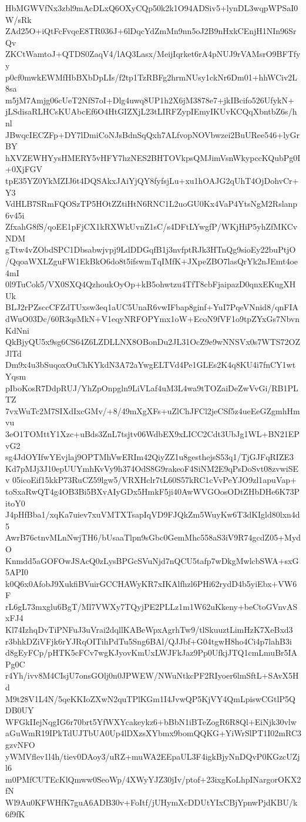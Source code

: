 HbMGWVfNx3zbl9mAcDLxQ6OXyCQp50k2k1O94ADSiv5+lynDL3wqpWPSaI0W/sRk
ZAd25O+iQtFcFvqeE8TR036J+6lDqcYdZmMn9nn5oJ2B9nHxkCEnjH1NIn96SrQv
ZKCtWamtoJ+QTDS0ZaqV4/lAQ3Lasx/MeijIqrket6rA4pNUJ9rVAMsrO9BFTfyy
p0cf0mwkEWMfHbBXbDpLIs/f2tp1TzRBFg2hrmNUsy1ckNr6Dm01+hhWCiv2L8sa
m5jM7Amjg06cUeT2NfS7oI+Dlg4uwq8UP1h2X6jM3878e7+jkIBcifo526UfykN+
jLSdisaRLHCsKUAbcEf6O4HtGIZXjL23tLIRFZypIEmyIKUvKCQqXbntbZ6s/hnl
JBwqcIECZFp+DY7lDmiCoNJsBdnSqQxh7ALfvopNOVbwzei2BuURee546+lyGrBY
hXVZEWHYysHMERY5vHFY7hzNES2BHTOVkpsQMJimVsnWkypccKQubPg0I+0XjFGV
tpE35YZ0YkMZIJ6t4DQSAkxJAiYjQY8fyfsjLu+xu1hOAJG2qUhT4OjDohvCr+Y3
VdHLB7SRmFQOSzTP5HOtZZtiHtN6RNC1L2uoGU0Kx4VaP4YtsNgM2Rslanp6v45i
ZfxahG8fS/qoEE1pFjCX1kRXWkUvnZ1sC/s4DFtLYwgfP/WKjHiP5yhZfMKCvNDM
gTtw4vZObdSPC1Dbsabwjvpj9LdDDGqfB1j3nvfptRJk3HTnQg9sioEy22buPtjO
/QqoaWXLZguFW1EkBkO6do8t5ifswmTqIMfK+JXpeZBO7lasQrYk2nJEmt4oe4mI
0l9TuCok5/VX0SXQ4QzhoukOyOp+kB5ohwtzu4TfT8cbFjaipazD0qnxEKugXHUk
BLJ2rPZsccCFZdTUxsw3eq1aUC5UnaR6vwIFbap8ginf+YuI7PqeVNnid8/qnFIA
dWuO03Dc/60R3qsMkN+V1eqyNRFOPYmx1oW+EcoN9fVF1o9tpZYxGs7NbvnKdNni
QkBjyQU5x9sg6CS64Z6LZDLLNX8OBonDu2JL31OcZ9e9wNNSVx0s7WTS72OZJlTd
Dm9x4u3bSuqoxOuChKYkdN3A72aYwgELTVd4Pe1GLEs2K4q8KU4i7fnCY1wtYqsm
pIboKosR7DdpRUJ/YhZpOnpgln9LiVLaf4uM3L4wa9tTOZaiDeZwVvGi/RB1PLTZ
7vxWuTc2M7SIXdIxcGMv/+8/49mXgXFs+uZlChJFCl2jeCSf5z4ueEeGZgmhHmvu
3eO1TOMttY1Xzc+uBds3ZnL7tsjtv06WdbEX9xLICC2Cdt3UbJg1WL+BN21EPvG2
sg4JdOYIfwYEvjlaj9OPTMhVwERIm42QiyZZ1u8gesthejsS53q1/TjGJFqRIZE3
Kd7pMJj3J10epUUYmhKvVy9h374OdS8G9rakeoF4SiNM2E9qPsDoSvt08zvwiSEv
05icoEif15kkP73RuCZ59lgw5/VRXHclr7tL60S57kRC1cVvPeYJO9zl1apuVap+
toSxaRwQT4g4OB3Bi5BXvAIyGDx5HmkF5ji40AwWVGOosODtZHbDHe6K73PitoY0
J4pHfBba1/xqKa7uiev7xuVMTXTsapIqVD9FJQkZm5WuyKw6T3dKIgld80lxn4d5
AwrB76ctnvMLnNwjTH6/bUsaaTlpn9sGbc0GemMhc558aS3iV9R74gcdZ05+MydO
Knmdd5aGOFOwJSAcQ0zLysBPGcSVuNjd7nQCU5tafp7wDkgMwlcbSWA+sxG5API0
k0Q6x0AfobJ9XukfiBVuirGCCHAWyKR7xIKAlfhzl6PHi62rydD4b5yiEbx+VW6F
rL6gL73mxglu6BgT/Ml7VWXy7TQyjPE2PLLz1m1W62uKkeny+beCtoGVnvASxFJ4
Kl74IzhqDvTiPNFuJ3uVrai2dqllKABeWpxAgrhTw9/tlSkuuztLimHzK7XeBxd3
r3bhkDZiVFjk6rYJRqOITihPdTu5Sng6BAl/QJJbf+G04tgwH8ho4Ci4p7lahB3i
d8gEyFCp/pHTK5cFCv7wgKJyovKmUxLWJFkJaz9Pp0UfkjJTQ1cmLmuBr5IAPg0C
r4Yh/ivv8M4CIsjU7onsGOlj0n0JPWEW/NWuNtkcPF2RIyoer6lmSftL+SAvX5Hd
M9t28V1L4N/5qeKKIoZXwN2quTPlKGm1I4JvwQP5KjVY4QmLpiswCGtlP5QDB0UY
WFGkIIejNqgIG6r70brt5YfWXYcakeykz6+bBbN1iBTeZogR6R8Ql+EiNjk30vlw
aGuWmR19IPkTdUJTbUA0Up4lDXzsXYbmx9bomQQKG+YiWrSlPT1I02mRC3gzvNFO
yWMVflev1l4h/tiev0DAoy3/uRZ+muWA2EEpaUL3F4igkBjyNnDQvP0KGzcUZjl6
m0PMfCUTEcKlQmww0SeoWp/4XWyYJZ30jIv/ptof+23ixgKoLhpINargorOKX2fN
Wl9Au0KFWHfK7guA6ADB30v+FoItf/jUHymXcDDUtYIxCBjYpnwPjdKBU/k6f9fK

